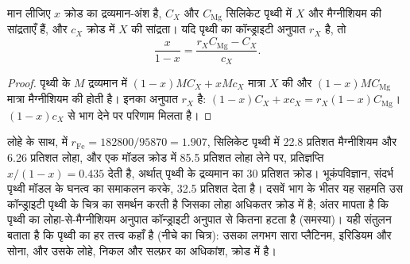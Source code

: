 \begin{proposition}[कॉन्ड्राइटी अनुपात से क्रोड का द्रव्यमान-अंश]
\label{prop:b2:elements-in-the-earth:core}
मान लीजिए $x$ क्रोड का द्रव्यमान-अंश है, $C_X$ और $C_{\mathrm{Mg}}$
सिलिकेट पृथ्वी में $X$ और मैग्नीशियम की सांद्रताएँ हैं, और $c_X$
क्रोड में $X$ की सांद्रता। यदि पृथ्वी का कॉन्ड्राइटी अनुपात $r_X$ है, तो
\[
  \frac{x}{1-x} = \frac{r_X C_{\mathrm{Mg}} - C_X}{c_X}.
\]
\end{proposition}

\begin{proof}
पृथ्वी के $M$ द्रव्यमान में $(1-x)MC_X + xMc_X$ मात्रा $X$ की और $(1-x)MC_{\mathrm{Mg}}$
मात्रा मैग्नीशियम की होती है। इनका अनुपात $r_X$ है:
$(1-x)C_X + xc_X = r_X(1-x)C_{\mathrm{Mg}}$। $(1-x)c_X$ से भाग देने पर
परिणाम मिलता है।
\end{proof}

लोहे के साथ,  में $r_{\mathrm{Fe}} = \num{182800}/\num{95870} = 1.907$,
सिलिकेट पृथ्वी में 22.8 प्रतिशत मैग्नीशियम और 6.26 प्रतिशत लोहा, और एक मॉडल क्रोड में 85.5
प्रतिशत लोहा लेने पर, प्रतिज्ञप्ति $x/(1-x) = 0.435$ देती है, अर्थात् पृथ्वी के द्रव्यमान का 30
प्रतिशत क्रोड। भूकंपविज्ञान, संदर्भ पृथ्वी मॉडल के घनत्व का समाकलन करके,
32.5 प्रतिशत देता है। दसवें भाग के भीतर यह सहमति
उस कॉन्ड्राइटी पृथ्वी के चित्र का समर्थन करती है जिसका लोहा अधिकतर क्रोड में है;
अंतर मापता है कि पृथ्वी का लोहा-से-मैग्नीशियम अनुपात कॉन्ड्राइटी अनुपात से कितना
हटता है (समस्या)। यही संतुलन बताता है कि पृथ्वी का हर तत्त्व कहाँ है
(नीचे का चित्र): उसका लगभग सारा प्लैटिनम, इरिडियम और सोना, और उसके लोहे,
निकल और सल्फ़र का अधिकांश, क्रोड में है।

\begin{omfigure}
\centering
{}
\par{}
\end{omfigure}

